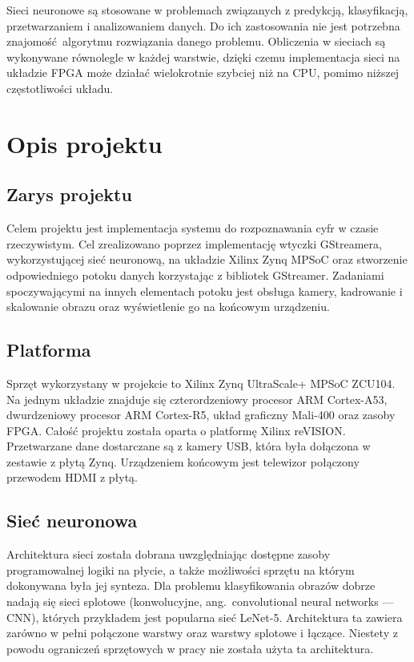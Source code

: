 \documentclass[12pt, oneside, a4paper]{article}
\begin{document}
Sieci neuronowe są stosowane w problemach
związanych z predykcją, klasyfikacją, przetwarzaniem i analizowaniem
danych. Do ich zastosowania nie jest potrzebna znajomość algorytmu rozwiązania
danego problemu. Obliczenia w sieciach są wykonywane równolegle w każdej
warstwie, dzięki czemu implementacja sieci na układzie FPGA może działać
wielokrotnie szybciej niż na CPU, pomimo niższej częstotliwości układu.

\newpage
\section{Opis projektu}

\subsection{Zarys projektu}
Celem projektu jest implementacja systemu do rozpoznawania cyfr
w czasie rzeczywistym. Cel zrealizowano poprzez implementację
wtyczki GStreamera, wykorzystującej sieć neuronową, na układzie
Xilinx Zynq MPSoC oraz stworzenie odpowiedniego potoku danych
korzystając z bibliotek GStreamer. Zadaniami spoczywającymi na innych
elementach potoku jest obsługa kamery,
kadrowanie i skalowanie obrazu oraz wyświetlenie go na końcowym urządzeniu.

\subsection{Platforma}
Sprzęt wykorzystany w projekcie to Xilinx Zynq UltraScale+ MPSoC ZCU104.
Na jednym układzie znajduje się czterordzeniowy procesor
ARM \mbox{Cortex-A53},
dwurdzeniowy procesor ARM \mbox{Cortex-R5},
układ graficzny \mbox{Mali-400} oraz zasoby FPGA.
Całość projektu została oparta o platformę Xilinx reVISION. Przetwarzane
dane dostarczane są z kamery USB, która była dołączona w zestawie z płytą Zynq.
Urządzeniem końcowym jest telewizor połączony przewodem HDMI z płytą.

\subsection{Sieć neuronowa}
Architektura sieci została dobrana uwzględniając dostępne zasoby programowalnej
logiki na płycie, a także możliwości sprzętu na którym dokonywana była jej
synteza. Dla problemu klasyfikowania obrazów dobrze nadają się sieci
splotowe (konwolucyjne, ang.\ convolutional neural networks --- CNN), 
 których przykładem jest popularna sieć \mbox{LeNet-5}.
Architektura ta zawiera zarówno w pełni połączone warstwy
oraz warstwy splotowe i łączące.
Niestety z powodu ograniczeń sprzętowych w pracy nie została użyta ta
architektura.
\end{document}
